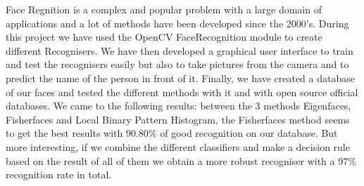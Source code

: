 Face Regnition is a complex and popular problem with a large domain of applications and a lot of methods have been developed since the 
2000's. During this project we have used the OpenCV FaceRecognition module to create different Recognisers. We have then developed a graphical user 
interface to train and test the recognisers easily but also to take pictures from the camera and to predict the name of the person in front of it. Finally, we have created a database of our faces and tested the different methods with it and with open source official databases. We came to the 
following results: between the 3 methods Eigenfaces, Fisherfaces and Local Binary Pattern Histogram, the Fisherfaces method seems to get the best 
results with 90.80\% of good recognition on our database. But more interesting, if we combine the different classifiers and make a decision rule based on the result of all of them we obtain a more robust recogniser with a 97\% recognition rate in total.